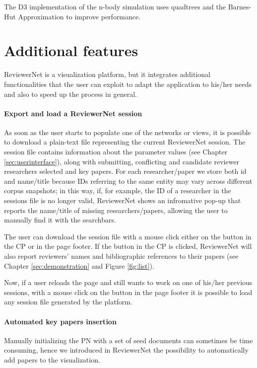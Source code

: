 The D3 implementation of the n-body simulation uses quadtrees and the Barnes-Hut Approximation \cite{Barnes1986} to improve performance.

\section{Additional features}\label{sec:misccode}
ReviewerNet is a visualization platform, but it integrates additional functionalities that the user can exploit to adapt the application to his/her needs and also to speed up the process in general.

\paragraph*{Export and load a ReviewerNet session}
As soon as the user starts to populate one of the networks or views, it is possible to download a plain-text file representing the current ReviewerNet session. The session file contains information about the parameter values (see Chapter \ref{sec:userinterface}), along with submitting, conflicting and candidate reviewer researchers selected and key papers. For each researcher/paper we store both id and name/title because IDs referring to the same entity may vary across different corpus snapshots; in this way, if, for example, the ID of a researcher in the sessions file is no longer valid, ReviewerNet shows an infromative pop-up that reports the name/title of missing researchers/papers, allowing the user to manually find it with the searchbars.     

The user can download the session file with a mouse click either on the  button in the CP or in the page footer. If the button in the CP is clicked, ReviewerNet will also report reviewers’ names and bibliographic references to their papers (see Chapter \ref{sec:demonstration} and Figure \ref{fig:list}).

Now, if a user reloads the page and still wants to work on one of his/her previous sessions, with a mouse click on the  button in the page footer it is possible to load any session file generated by the platform.

\paragraph*{Automated key papers insertion}
Manually initializing the PN with a set of seed documents can sometimes be time consuming, hence we introduced in ReviewerNet the possibility to automatically add papers to the visualization. 

